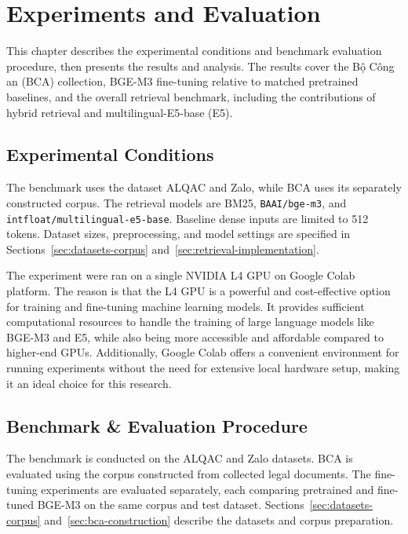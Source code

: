 \chapter{Experiments and Evaluation}

This chapter describes the experimental conditions and benchmark evaluation procedure, then presents the results and analysis. The results cover the Bộ Công an (BCA) collection, BGE-M3 fine-tuning relative to matched pretrained baselines, and the overall retrieval benchmark, including the contributions of hybrid retrieval and multilingual-E5-base (E5).

\section{Experimental Conditions}
\label{sec:results-experimental-conditions}

The benchmark uses the dataset ALQAC and Zalo, while BCA uses its separately constructed corpus. The retrieval models are BM25, \texttt{BAAI/bge-m3}, and \texttt{intfloat/multilingual-e5-base}. Baseline dense inputs are limited to 512 tokens. Dataset sizes, preprocessing, and model settings are specified in Sections~\ref{sec:datasets-corpus} and~\ref{sec:retrieval-implementation}.


The experiment were ran on a single NVIDIA L4 GPU on Google Colab platform. The reason is that the L4 GPU is a powerful and cost-effective option for training and fine-tuning machine learning models. It provides sufficient computational resources to handle the training of large language models like BGE-M3 and E5, while also being more accessible and affordable compared to higher-end GPUs. Additionally, Google Colab offers a convenient environment for running experiments without the need for extensive local hardware setup, making it an ideal choice for this research. 

\section{Benchmark \& Evaluation Procedure}
\label{sec:benchmark-evaluation-procedure}

The benchmark is conducted on the ALQAC and Zalo datasets. BCA is evaluated using the corpus constructed from collected legal documents. The fine-tuning experiments are evaluated separately, each comparing pretrained and fine-tuned BGE-M3 on the same corpus and test dataset. Sections~\ref{sec:datasets-corpus} and~\ref{sec:bca-construction} describe the datasets and corpus preparation.

